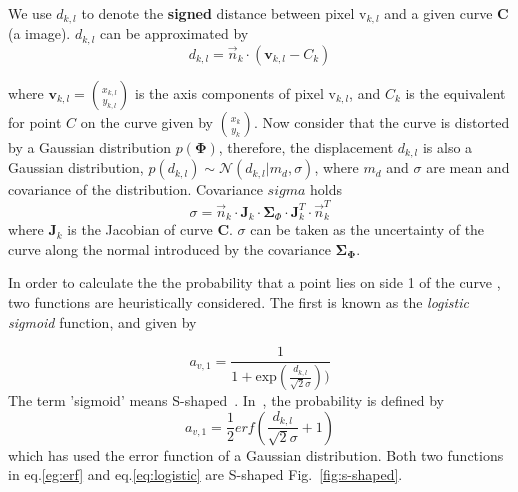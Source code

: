 We use $d_{k,l}$ to denote the \textbf{signed} distance between pixel
$\mathrm{v}_{k,l}$ and a given curve $\mathbf{C}$(a image). $d_{k,l}$
can be approximated by
\begin{equation}
  \label{eq:dis}
  d_{k,l} = \vec{n}_k \cdot ( \mathbf{v}_{k,l} - C_k)
\end{equation}

where $\mathbf{v}_{k,l} = {x_{k,l} \choose y_{k,l}}$ is the axis components of pixel
$\mathrm{v}_{k,l}$, and $C_k$ is the equivalent for point $C$ on the
curve given by ${x_k \choose y_k}$. Now consider that the curve is
distorted by a Gaussian distribution $p(\mathbf{\Phi})$, therefore, the
displacement $d_{k,l}$ is also a Gaussian distribution, $p(d_{k,l}) \sim
\mathcal{N}(d_{k,l}|m_d, \sigma)$, where $m_d$ and $\sigma$ are mean
and covariance of the distribution. Covariance $sigma$ holds
\begin{equation}
  \label{eq:cov}
  \sigma = \vec{n}_k \cdot \mathbf{J}_k \cdot \mathbf{\Sigma}_{\Phi}
  \cdot \mathbf{J}_k^T \cdot \vec{n}_k^T
\end{equation}
where $\mathbf{J}_k$ is the Jacobian of curve $\mathbf{C}$. $\sigma$
can be taken as the uncertainty of the curve along the normal
introduced by the covariance $\mathbf{\Sigma}_{\mathbf{\Phi}}$.

In order to calculate the the probability that a point lies on side 1 of the curve
, two functions are heuristically considered. The first is known as
the \textit{logistic sigmoid} function, and given by

\begin{equation}
  \label{eq:logistic}
  a_{v,1} = \frac{1}{1+\mathrm{exp}(\frac{d_{k,l}}{\sqrt{2}\sigma}))}
\end{equation}
The term 'sigmoid' means
S-shaped~\cite{bishop2006pattern}. In~\cite{hanek2004contracting}, 
the probability is defined by
\begin{equation}
  \label{eq:erf}
  a_{v,1} = \frac{1}{2}erf(\frac{d_{k,l}}{\sqrt{2}\sigma} + 1)
\end{equation}
which has used the error function of a Gaussian distribution. Both
two functions in eq.\ref{eg:erf} and eq.\ref{eq:logistic} are
S-shaped Fig.~\ref{fig:s-shaped}.

